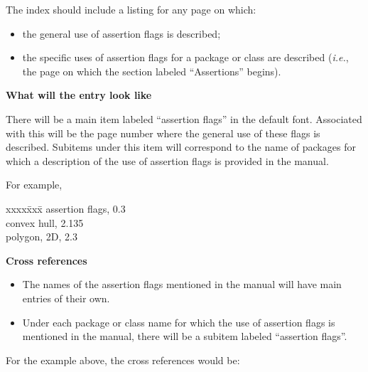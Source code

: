 \documentclass{article}
\newenvironment{indexex}{\begin{tabbing}
xxxx\=xxx\=\kill}{\end{tabbing}}
\begin{document}
\begin{description}
   \item[\bf Which pages]
  
         The index should include a listing for any page on which:
      \begin{itemize}
          \item the general use of assertion flags is described;
          \item the specific uses of assertion flags for 
                a package or class are described 
                ({\em i.e.}, the page on which the section labeled 
                 ``Assertions'' begins).
      \end{itemize}

   \item {\bf What will the entry look like}

      There will be a main item labeled ``assertion flags'' in the default
      font.  Associated with
      this will be the page number where the general use of these flags is
      described.  Subitems under this item will correspond to the name of
      packages for which a description of the use of assertion flags is 
      provided in the manual. 

      For example, 

           \begin{indexex}
           assertion flags,                                 0.3       \\
            \> convex hull,                                 2.135     \\
            \> polygon, 2D,                                 2.3   
           \end{indexex}


   \item {\bf Cross references}
      
      \begin{itemize}
         \item The names of the assertion flags mentioned in the 
               manual will have main entries of their own.
         \item Under each package or class name for which the use of
               assertion flags is mentioned in the manual, there will be
               a subitem labeled ``assertion flags''.
      \end{itemize}

      For the example above, the cross references would be:


\end{description}
\end{document}
